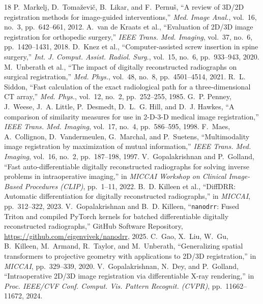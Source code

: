 \documentclass[journal]{IEEEtran}
\begin{document}

\begin{thebibliography}{18}
P.~Markelj, D.~Toma\v{z}evi\v{c}, B.~Likar, and F.~Pernu\v{s}, ``A review of 3D/2D registration methods for image-guided interventions,'' \emph{Med. Image Anal.}, vol.~16, no.~3, pp.~642--661, 2012.
A.~van de Kraats et al., ``Evaluation of 2D/3D image registration for orthopedic surgery,'' \emph{IEEE Trans. Med. Imaging}, vol.~37, no.~6, pp.~1420--1431, 2018.
D.~Knez et al., ``Computer-assisted screw insertion in spine surgery,'' \emph{Int. J. Comput. Assist. Radiol. Surg.}, vol.~15, no.~6, pp.~933--943, 2020.
M.~Unberath et al., ``The impact of digitally reconstructed radiographs on surgical registration,'' \emph{Med. Phys.}, vol.~48, no.~8, pp.~4501--4514, 2021.
R.~L. Siddon, ``Fast calculation of the exact radiological path for a three-dimensional CT array,'' \emph{Med. Phys.}, vol.~12, no.~2, pp.~252--255, 1985.
G.~P. Penney, J.~Weese, J.~A. Little, P.~Desmedt, D.~L.~G. Hill, and D.~J. Hawkes, ``A comparison of similarity measures for use in 2-D-3-D medical image registration,'' \emph{IEEE Trans. Med. Imaging}, vol.~17, no.~4, pp.~586--595, 1998.
F.~Maes, A.~Collignon, D.~Vandermeulen, G.~Marchal, and P.~Suetens, ``Multimodality image registration by maximization of mutual information,'' \emph{IEEE Trans. Med. Imaging}, vol.~16, no.~2, pp.~187--198, 1997.
V.~Gopalakrishnan and P.~Golland, ``Fast auto-differentiable digitally reconstructed radiographs for solving inverse problems in intraoperative imaging,'' in \emph{MICCAI Workshop on Clinical Image-Based Procedures (CLIP)}, pp.~1--11, 2022.
B.~D. Killeen et al., ``DiffDRR: Automatic differentiation for digitally reconstructed radiographs,'' in \emph{MICCAI}, pp.~312--322, 2023.
V.~Gopalakrishnan and B.~D. Killeen, ``\texttt{nanodrr}: Fused Triton and compiled PyTorch kernels for batched differentiable digitally reconstructed radiographs,'' GitHub Software Repository, \url{https://github.com/eigenvivek/nanodrr}, 2025.
C.~Gao, X.~Liu, W.~Gu, B.~Killeen, M.~Armand, R.~Taylor, and M.~Unberath, ``Generalizing spatial transformers to projective geometry with applications to 2D/3D registration,'' in \emph{MICCAI}, pp.~329--339, 2020.
V.~Gopalakrishnan, N.~Dey, and P.~Golland, ``Intraoperative 2D/3D image registration via differentiable X-ray rendering,'' in \emph{Proc. IEEE/CVF Conf. Comput. Vis. Pattern Recognit. (CVPR)}, pp.~11662--11672, 2024.

\end{thebibliography}
\end{document}
